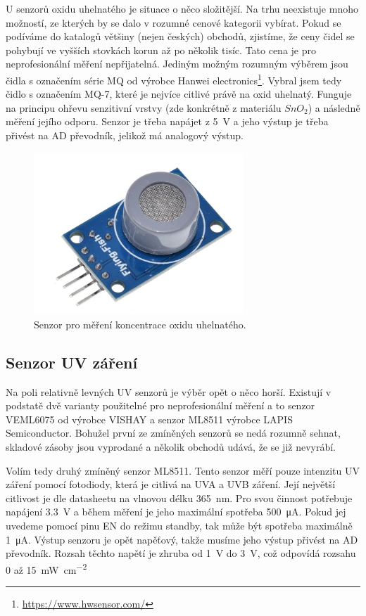 U senzorů oxidu uhelnatého je situace o něco složitější. Na trhu neexistuje mnoho možností, ze kterých by se dalo v rozumné cenové kategorii vybírat. Pokud se podíváme do katalogů většiny (nejen českých) obchodů, zjistíme, že ceny čidel se pohybují ve vyšších stovkách korun až po několik tisíc. Tato cena je pro neprofesionální měření nepřijatelná. Jediným možným rozumným výběrem jsou čidla s označením série MQ od výrobce Hanwei electronics\footnote{\url{https://www.hwsensor.com/}}. Vybral jsem tedy čidlo s označením MQ-7, které je nejvíce citlivé právě na oxid uhelnatý. Funguje na principu ohřevu senzitivní vrstvy (zde konkrétně z materiálu $SnO_{2}$) a následně měření jejího odporu. Senzor je třeba napájet z \SI{5}{\volt} a jeho výstup je třeba přivést na AD převodník, jelikož má analogový výstup.

\begin{figure}
    \centering
    \includegraphics[width=0.7\textwidth]{obrazky/mq7.jpg}
    \caption{Senzor pro měření koncentrace oxidu uhelnatého. \cite{img_mq7}}
    \label{fig_MQ7}
\end{figure}

\subsection{Senzor UV záření}

Na poli relativně levných UV senzorů je výběr opět o něco horší. Existují v podstatě dvě varianty použitelné pro neprofesionální měření a to senzor VEML6075 od výrobce VISHAY a senzor ML8511 výrobce LAPIS Semiconductor. Bohužel první ze zmíněných senzorů se nedá rozumně sehnat, skladové zásoby jsou vyprodané a několik obchodů udává, že se již nevyrábí.

Volím tedy druhý zmíněný senzor ML8511. Tento senzor měří pouze intenzitu UV záření pomocí fotodiody, která je citlivá na UVA a UVB záření. Její největší citlivost je dle datasheetu \cite{dat_ML8511} na vlnovou délku \SI{365}{\nano\metre}. Pro svou činnost potřebuje napájení \SI{3,3}{\volt} a během měření je jeho maximální spotřeba \SI{500}{\micro\ampere}. Pokud jej uvedeme pomocí pinu EN do režimu standby, tak může být spotřeba maximálně \SI{1}{\micro\ampere}. Výstup senzoru je opět napěťový, takže musíme jeho výstup přivést na AD převodník. Rozsah těchto napětí je zhruba od \SI{1}{\volt} do \SI{3}{\volt}, což odpovídá rozsahu \SI{0}{} až \SI{15}{\milli\watt\per\centi\metre\squared}

